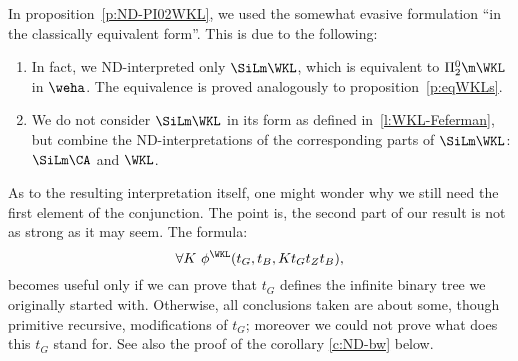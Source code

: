 \begin{rmk}
In proposition~\ref{p:ND-PI02WKL}, we used the somewhat evasive formulation 
``in the classically equivalent form''. This is due to the following:
\begin{enumerate}
\item In fact, we ND-interpreted only $\SiLm\WKL$, which is equivalent to $\Pi^0_2\m\WKL$ in
$\weha$. The equivalence is proved 
analogously to 
proposition~\ref{p:eqWKLs}.
\item We do not consider $\SiLm\WKL$ in its form as defined in~\ref{l:WKL-Feferman}, 
but combine the ND-interpretations of the
corresponding parts of $\SiLm\WKL$: $\SiLm\CA$ and $\WKL$.
\end{enumerate}
As to the resulting interpretation itself, one might wonder why we still need the first element of the conjunction.
The point is, the second part of our result is not as strong as it may seem. 
The formula:
\[
\forall K\ \phi^{\WKL}(t_{G},t_{B},Kt_{G}t_{Z}t_{B}) \text{,}
\]
becomes useful only if we can prove that $t_{G}$ defines the 
infinite binary tree we originally started with. 
Otherwise, all conclusions taken are about some, though primitive recursive, 
modifications of $t_G$; moreover we could not prove what does this $t_G$ stand for. 
See also the proof of the corollary \ref{c:ND-bw} below.
\end{rmk}
%
%
%
%
